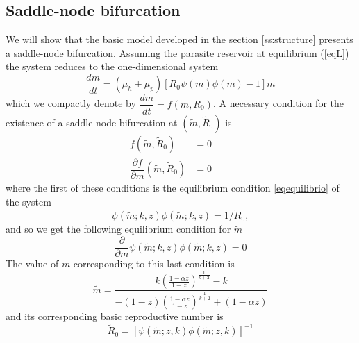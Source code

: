 \documentclass[12pt,a4paper]{article}
\theoremstyle{plain}%
\theoremstyle{definition}
\theoremstyle{remark}
\begin{document}
\subsection{Saddle-node bifurcation}\label{bifurcacion}
We will show that the basic model developed in the section \ref{ss:structure} presents a saddle-node bifurcation. Assuming the parasite reservoir at equilibrium (\ref{eqL})  the system reduces to the one-dimensional system 
\begin{equation*}
\dfrac{dm}{dt}=(\mu_h + \mu_p)\left[ R_0  \psi(m)\phi(m) -1 \right] m%
\end{equation*}
which we compactly denote by
$\dfrac{dm}{dt}=f(m,R_0)$.
A necessary condition for the existence of a saddle-node bifurcation at 
$(\tilde m,\tilde R_0)$ is
\begin{equation}
\begin{split}
f(\tilde m,\tilde R_0)&=0\qquad\\
\dfrac{\partial f}{\partial m}(\tilde m,\tilde R_0)&=0
\end{split}
\end{equation}
where the first of these conditions is the equilibrium condition \eqref{eqequilibrio} of the system
\begin{equation*}
\psi(\tilde m;k,z)\phi(\tilde m;k,z)=1/\tilde R_0,
\end{equation*}
and so we get the following equilibrium condition for $\tilde m$
\begin{equation}
\frac{\partial }{\partial m}\psi(\tilde m;k,z)\phi(\tilde m;k,z)=0	
\end{equation}
The value of $m$ corresponding to this last condition is
\begin{equation}
\tilde m=\dfrac{k\left( \frac{1-\alpha z}{1-z}\right)^{\frac{1}{k+2}} - k}{-(1-z)\left( \frac{1-\alpha z}{1-z}\right)^{\frac{1}{k+2}} + (1-\alpha z)}	
\end{equation}
and its corresponding basic reproductive number is
\begin{equation}
\tilde R_0=\left[ \psi(\tilde m;z,k)\phi(\tilde m;z,k)\right]^{-1}
\end{equation}	
 
\end{document}
